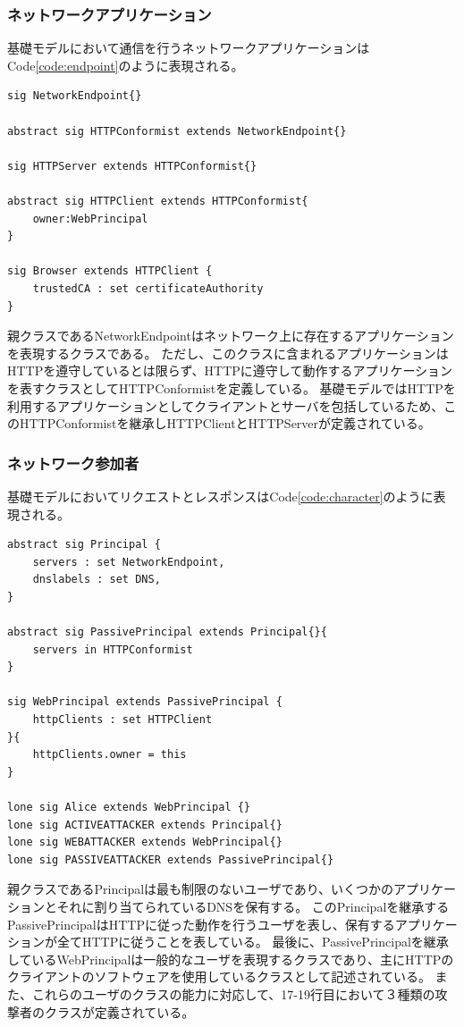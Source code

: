 \documentclass[12pt,a4paper]{jbook}
\begin{document}
\subsubsection{ネットワークアプリケーション}
基礎モデルにおいて通信を行うネットワークアプリケーションはCode\ref{code:endpoint}のように表現される。
\begin{lstlisting}[caption=ネットワーク参加者, label=code:endpoint]
sig NetworkEndpoint{}

abstract sig HTTPConformist extends NetworkEndpoint{}

sig HTTPServer extends HTTPConformist{}

abstract sig HTTPClient extends HTTPConformist{
	owner:WebPrincipal
}

sig Browser extends HTTPClient {
	trustedCA : set certificateAuthority
}
\end{lstlisting}
親クラスであるNetworkEndpointはネットワーク上に存在するアプリケーションを表現するクラスである。
ただし、このクラスに含まれるアプリケーションはHTTPを遵守しているとは限らず、HTTPに遵守して動作するアプリケーションを表すクラスとしてHTTPConformistを定義している。
基礎モデルではHTTPを利用するアプリケーションとしてクライアントとサーバを包括しているため、このHTTPConformistを継承しHTTPClientとHTTPServerが定義されている。

\subsubsection{ネットワーク参加者}
基礎モデルにおいてリクエストとレスポンスはCode\ref{code:character}のように表現される。
\begin{lstlisting}[caption=ネットワーク参加者, label=code:character]
abstract sig Principal {
	servers : set NetworkEndpoint,
	dnslabels : set DNS,
}

abstract sig PassivePrincipal extends Principal{}{
	servers in HTTPConformist
}

sig WebPrincipal extends PassivePrincipal {
	httpClients : set HTTPClient
}{
	httpClients.owner = this
}

lone sig Alice extends WebPrincipal {}
lone sig ACTIVEATTACKER extends Principal{}
lone sig WEBATTACKER extends WebPrincipal{}
lone sig PASSIVEATTACKER extends PassivePrincipal{}
\end{lstlisting}
親クラスであるPrincipalは最も制限のないユーザであり、いくつかのアプリケーションとそれに割り当てられているDNSを保有する。
このPrincipalを継承するPassivePrincipalはHTTPに従った動作を行うユーザを表し、保有するアプリケーションが全てHTTPに従うことを表している。
最後に、PassivePrincipalを継承しているWebPrincipalは一般的なユーザを表現するクラスであり、主にHTTPのクライアントのソフトウェアを使用しているクラスとして記述されている。
また、これらのユーザのクラスの能力に対応して、17-19行目において３種類の攻撃者のクラスが定義されている。
\end{document}

